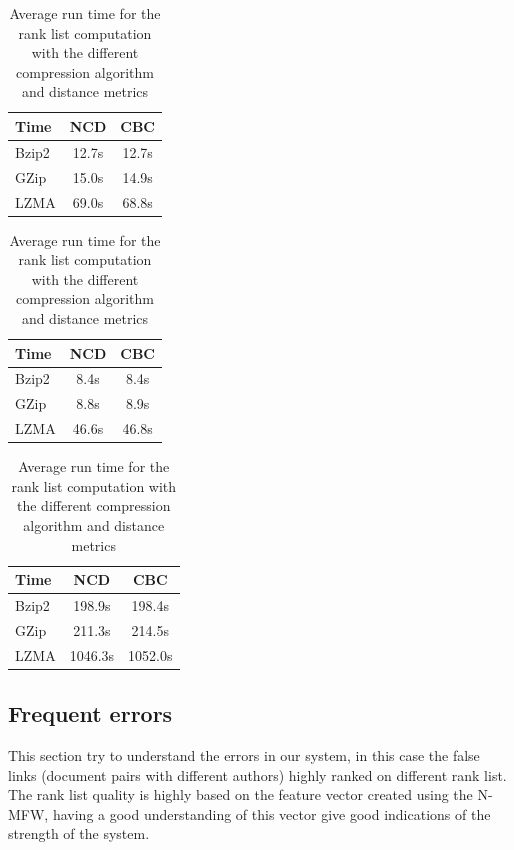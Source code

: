 \begin{table}
  \centering
  \label{tab:compression_evaluation_time}
  \caption{Average run time for the rank list computation with the different compression algorithm and distance metrics}

  \label{tab:compression_evaluation_time_oxquarry}
  \begin{tabular}{l c c}
    \toprule
    Time      & NCD   & CBC \\
    \midrule
    Bzip2     & 12.7s & 12.7s \\
    GZip      & 15.0s & 14.9s \\
    LZMA      & 69.0s & 68.8s \\
    \bottomrule
  \end{tabular}

  \label{tab:compression_evaluation_time_brunet}
  \begin{tabular}{l c c}
    \toprule
    Time      & NCD   & CBC \\
    \midrule
    Bzip2     & 8.4s & 8.4s \\
    GZip      & 8.8s & 8.9s \\
    LZMA      & 46.6s & 46.8s \\
    \bottomrule
  \end{tabular}

  \label{tab:compression_evaluation_time_st_jean}
  \begin{tabular}{l c c}
    \toprule
    Time      & NCD    & CBC \\
    \midrule
    Bzip2     & 198.9s  & 198.4s \\
    GZip      & 211.3s  & 214.5s \\
    LZMA      & 1046.3s & 1052.0s \\
    \bottomrule
  \end{tabular}
\end{table}




\subsection{Frequent errors}

This section try to understand the errors in our system, in this case the false links (document pairs with different authors) highly ranked on different rank list.
The rank list quality is highly based on the feature vector created using the N-MFW, having a good understanding of this vector give good indications of the strength of the system.


